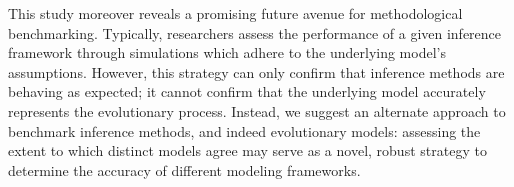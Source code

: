 \documentclass[11pt]{article}
\begin{document}






This study moreover reveals a promising future avenue for methodological benchmarking. Typically, researchers assess the performance of a given inference framework through simulations which adhere to the underlying model's assumptions. However, this strategy can only confirm that inference methods are behaving as expected; it cannot confirm that the underlying model accurately represents the evolutionary process. Instead, we suggest an alternate approach to benchmark inference methods, and indeed evolutionary models: assessing the extent to which distinct models agree may serve as a novel, robust strategy to determine the accuracy of different modeling frameworks.




	
\newpage

	
\end{document}
